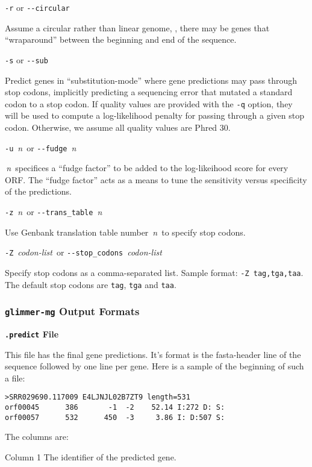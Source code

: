 \documentclass[fleqn,titlepage,11pt]{article}
\def\Desc#1{\,\mbox{\emph{#1}}\,}
\def\Pg#1{\texttt{#1}}
\begin{document}
\exdent
  \verb`-r` \enskip or \enskip \verb`--circular`

  Assume a circular rather than linear genome, \ie, there may
  be genes that ``wraparound'' between the beginning and end
  of the sequence.

\exdent
  \verb`-s` \enskip or \enskip \verb`--sub`

  Predict genes in ``substitution-mode'' where gene predictions may
  pass through stop codons, implicitly predicting a sequencing error
  that mutated a standard codon to a stop codon. If quality values are
  provided with the \verb`-q` option, they will be used to compute a
  log-likelihood penalty for passing through a given stop
  codon. Otherwise, we assume all quality values are Phred 30.

\exdent
  \verb`-u` \Desc{n} \enskip or \enskip \verb`--fudge` \Desc{n}

  \Desc{n} specifices a ``fudge factor'' to be added to the
  log-likeihood score for every ORF. The ``fudge factor'' acts as a
  means to tune the sensitivity versus specificity of the predictions.
  
\exdent
  \verb`-z` \Desc{n} \enskip or \enskip \verb`--trans_table` \Desc{n}

  Use Genbank translation table number \Desc{n} to specify stop codons.

\exdent
  \verb`-Z` \Desc{codon-list} \enskip or \enskip \verb`--stop_codons` \Desc{codon-list}

  Specify stop codons as a comma-separated list.
  Sample format:  \verb`-Z tag,tga,taa`.
  The default stop codons are \Pg{tag}, \Pg{tga} and \Pg{taa}.
\el


\subsubsection{\Pg{glimmer-mg} Output Formats}

\smallskip
\noindent\textbf{\Pg{.predict} File}
\smallskip

This file has the final gene predictions.  It's format is the fasta-header
line of the sequence followed by one line per gene.  Here is a sample of the
beginning of such a file:
\BSV
\begin{verbatim}
>SRR029690.117009 E4LJNJL02B7ZT9 length=531
orf00045      386       -1  -2    52.14 I:272 D: S:
orf00057      532      450  -3     3.86 I: D:507 S:
\end{verbatim}
\ESV
The columns are:
\RaggedRight
\item[Column 1]
  The identifier of the predicted gene.
\end{document}
